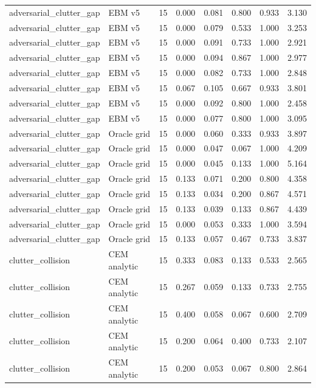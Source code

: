 {\begin{longtable}{llrrrrrr}
adversarial\_clutter\_gap & EBM v5 & 15 & 0.000 & 0.081 & 0.800 & 0.933 & 3.130 \\
adversarial\_clutter\_gap & EBM v5 & 15 & 0.000 & 0.079 & 0.533 & 1.000 & 3.253 \\
adversarial\_clutter\_gap & EBM v5 & 15 & 0.000 & 0.091 & 0.733 & 1.000 & 2.921 \\
adversarial\_clutter\_gap & EBM v5 & 15 & 0.000 & 0.094 & 0.867 & 1.000 & 2.977 \\
adversarial\_clutter\_gap & EBM v5 & 15 & 0.000 & 0.082 & 0.733 & 1.000 & 2.848 \\
adversarial\_clutter\_gap & EBM v5 & 15 & 0.067 & 0.105 & 0.667 & 0.933 & 3.801 \\
adversarial\_clutter\_gap & EBM v5 & 15 & 0.000 & 0.092 & 0.800 & 1.000 & 2.458 \\
adversarial\_clutter\_gap & EBM v5 & 15 & 0.000 & 0.077 & 0.800 & 1.000 & 3.095 \\
adversarial\_clutter\_gap & Oracle grid & 15 & 0.000 & 0.060 & 0.333 & 0.933 & 3.897 \\
adversarial\_clutter\_gap & Oracle grid & 15 & 0.000 & 0.047 & 0.067 & 1.000 & 4.209 \\
adversarial\_clutter\_gap & Oracle grid & 15 & 0.000 & 0.045 & 0.133 & 1.000 & 5.164 \\
adversarial\_clutter\_gap & Oracle grid & 15 & 0.133 & 0.071 & 0.200 & 0.800 & 4.358 \\
adversarial\_clutter\_gap & Oracle grid & 15 & 0.133 & 0.034 & 0.200 & 0.867 & 4.571 \\
adversarial\_clutter\_gap & Oracle grid & 15 & 0.133 & 0.039 & 0.133 & 0.867 & 4.439 \\
adversarial\_clutter\_gap & Oracle grid & 15 & 0.000 & 0.053 & 0.333 & 1.000 & 3.594 \\
adversarial\_clutter\_gap & Oracle grid & 15 & 0.133 & 0.057 & 0.467 & 0.733 & 3.837 \\
clutter\_collision & CEM analytic & 15 & 0.333 & 0.083 & 0.133 & 0.533 & 2.565 \\
clutter\_collision & CEM analytic & 15 & 0.267 & 0.059 & 0.133 & 0.733 & 2.755 \\
clutter\_collision & CEM analytic & 15 & 0.400 & 0.058 & 0.067 & 0.600 & 2.709 \\
clutter\_collision & CEM analytic & 15 & 0.200 & 0.064 & 0.400 & 0.733 & 2.107 \\
clutter\_collision & CEM analytic & 15 & 0.200 & 0.053 & 0.067 & 0.800 & 2.864 \\

\end{longtable}}
